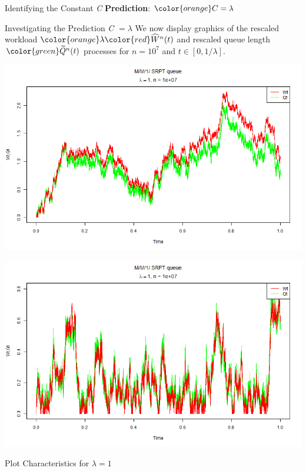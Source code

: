 \documentclass[16pt]{beamer}
\newcommand{\What}{\widehat{W}^{n}(t)}
\newcommand{\Qtild}{\widetilde{Q}^{n}(t)}
\begin{document}
\begin{frame}
\begin{textblock}{35}
\begin{block}{\huge Identifying the Constant \emph{{\color{orange}C}}}
{\bf Prediction}: ${\color{orange}C=\lambda}$
\end{block}
\vspace{\baselineskip}

\begin{block}{\huge Investigating the Prediction {\color{orange} \emph{C } $=\lambda$}}
We now display graphics of the rescaled workload ${\color{orange}\lambda}{\color{red}\What}$ and rescaled queue length ${\color{green}\Qtild}$ processes for $n=10^7$ and $t \in [0,1/\lambda]$.
\vspace{\baselineskip}

\begin{minipage}[t]{17cm}
\includegraphics[width = 17cm]{Pictures/normalPlot1_2.png}
\end{minipage}
\begin{minipage}[t]{17cm}
\includegraphics[width = 17cm]{Pictures/normalPlot1_1.png}
\end{minipage}
{\large Plot Characteristics for $\lambda=1$}\\

\end{block}
\end{textblock}
\end{frame}
\end{document}
